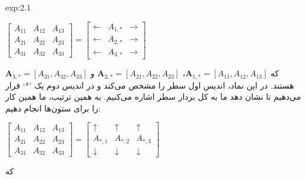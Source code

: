 {\begin{spacing}{1.5}
\begin{example}{exp:2.1}
            \begin{center}
                $\begin{bmatrix}
                     A_{11} & A_{12} & A_{13} \\
                     A_{21} & A_{22} & A_{23} \\
                     A_{31} & A_{32} & A_{33}
                \end{bmatrix}=\begin{bmatrix}
                                  \leftarrow & A_{1,*} & \rightarrow \\
                                  \leftarrow & A_{2,*} & \rightarrow \\
                                  \leftarrow & A_{3,*} & \rightarrow
                \end{bmatrix}$
            \end{center}

            که $\textbf{A}_{1,*}=[A_{11},A_{12},A_{13}]$، $\textbf{A}_{2,*}=[A_{21},A_{22},A_{23}]$ و $\textbf{A}_{3,*}=[A_{31},A_{32},A_{33}]$ هستند.
            در این نماد، اندیس اول سطر را مشخص می‌کند و در اندیس دوم یک ’*‘ قرار می‌دهیم تا نشان دهد ما به کل بردار سطر اشاره می‌کنیم. به همین ترتیب، ما همین کار را برای ستون‌ها انجام دهیم:

            \begin{center}
                $\begin{bmatrix}
                     A_{11} & A_{12} & A_{13} \\
                     A_{21} & A_{22} & A_{23} \\
                     A_{31} & A_{32} & A_{33}
                \end{bmatrix}=\begin{bmatrix}
                                  \uparrow   & \uparrow   & \uparrow   \\
                                  A_{*,1}    & A_{*,2}    & A_{*,3}    \\
                                  \downarrow & \downarrow & \downarrow
                \end{bmatrix}$
            \end{center}

            که


\end{example}
\end{spacing}}
